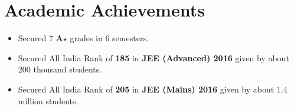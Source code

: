 \section*{Academic Achievements}
\begin{itemize}

\setlength\itemsep{0pt}
\item Secured 7 \textbf{A$\star$} grades in 6 semesters.
\item Secured All India Rank of {\bf 185} in {\bf JEE (Advanced) 2016} given by about 200 thousand students.
\item Secured All India Rank of {\bf 205} in {\bf JEE (Mains) 2016} given by about 1.4 million students.

\end{itemize}

